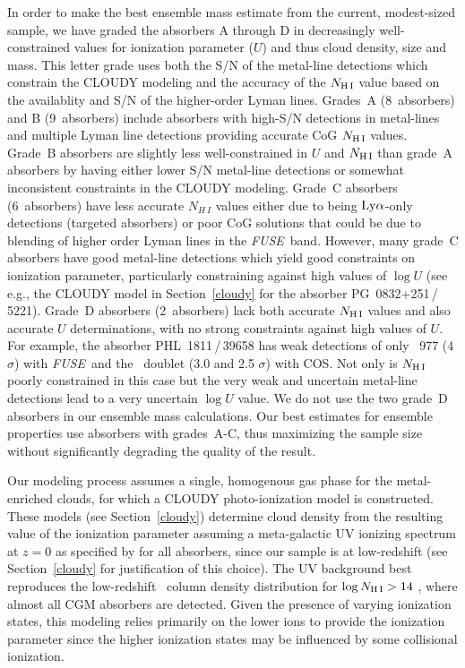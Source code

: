 \documentclass[twocolumn,twocolappendix,tighten,times]{aastex6}
\newcommand{\HI}{\ion{H}{1}}
\newcommand{\CIII}{\ion{C}{3}}
\newcommand{\CIV}{\ion{C}{4}}
\newcommand{\fuse}{{\sl FUSE}}
\newcommand{\lya}{\ensuremath{{\rm Ly}\alpha}}
\begin{document}
In order to make the best ensemble mass estimate from the current, modest-sized 
sample, we have graded the absorbers A through D in decreasingly well-constrained 
values for ionization parameter ($U$) and thus cloud density, size and mass. 
This letter grade uses both the S/N of the metal-line detections which 
constrain the CLOUDY modeling and the accuracy of the $N_{\rm H\,I}$ value based 
on the availablity and S/N of the higher-order Lyman lines. Grades~A (8~absorbers) 
and B (9~absorbers) include absorbers with high-S/N detections in metal-lines and 
multiple Lyman line detections providing accurate CoG $N_{\rm H\,I}$ values. 
Grade~B absorbers are slightly less well-constrained in $U$ and $N_{\rm H\,I}$ 
than grade~A absorbers by having either lower S/N metal-line detections or 
somewhat inconsistent constraints in the CLOUDY modeling. Grade~C absorbers 
(6~absorbers) have less accurate $N_{H\,I}$ values either due to being \lya-only 
detections (targeted absorbers) or poor CoG solutions that could be due to 
blending of higher order Lyman lines in the \fuse\ band. However, many grade~C 
absorbers have good metal-line detections which yield good constraints on 
ionization parameter, particularly constraining against high values of $\log{U}$ 
(see e.g., the CLOUDY model in Section~\ref{cloudy} for the absorber 
PG~0832+251\,/\,5221). Grade~D absorbers (2~absorbers) lack both accurate 
$N_{\rm H\,I}$ values and also accurate $U$ determinations, with no strong 
constraints against high values of $U$. For example, the absorber 
PHL~1811\,/\,39658 has weak detections of only \CIII\ 977 (4$\sigma$) with \fuse\ 
and the \CIV\ doublet (3.0 and 2.5 $\sigma$) with COS. Not only is $N_{\rm H\,I}$ 
poorly constrained in this case but the very weak and uncertain metal-line 
detections lead to a very uncertain $\log{U}$ value. We do not use the two 
grade~D absorbers in our ensemble mass calculations. Our best estimates for 
ensemble properties use absorbers with grades~A-C, thus maximizing the sample 
size without significantly degrading the quality of the result.
 
Our modeling process assumes a single, homogenous gas phase for the 
metal-enriched clouds, for which a CLOUDY \citep{ferland98} photo-ionization 
model is constructed. These models (see Section~\ref{cloudy}) determine cloud 
density from the resulting value of the ionization parameter assuming a 
meta-galactic UV ionizing spectrum at $z=0$ as specified by \citet{haardt12} 
for all absorbers, since our sample is at low-redshift (see Section~\ref{cloudy} 
for justification of this choice). The \citet{haardt12} UV background best 
reproduces the low-redshift \HI\ column density distribution \citep{danforth16} 
for $\log{N_{\rm H\,I}} > 14$ \citep{shull15}, where almost all CGM absorbers are 
detected. Given the presence of varying ionization states, this modeling relies 
primarily on the lower ions to provide the ionization parameter since the higher 
ionization states may be influenced by some collisional ionization. 
\end{document}
